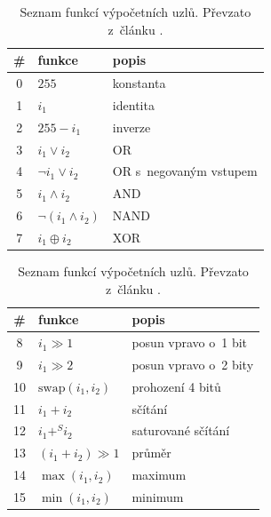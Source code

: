 \begin{table}[htb]
    \renewcommand{\arraystretch}{1.2}
    \begin{minipage}[t]{.5\textwidth}
        \small\centering\begin{tabular}{|c|l|l|}
            \hline
            \# & funkce & popis \\
            \hline
            0 & $255$ & konstanta \\
            1 & $i_1$ & identita \\
            2 & $255 - i_1$ & inverze \\
            3 & $i_1 \vee i_2$ & OR \\
            4 & $\neg i_1 \vee i_2$ & OR s~negovaným vstupem \\
            5 & $i_1 \wedge i_2$ & AND \\
            6 & $\neg (i_1 \wedge i_2)$ & NAND \\
            7 & $i_1 \oplus i_2$ & XOR \\
            \hline
        \end{tabular}

    \end{minipage}
    \begin{minipage}[t]{.5\textwidth}
        \small\centering\begin{tabular}{|c|l|l|}
            \hline
            \# & funkce & popis \\
            \hline
            8 & $i_1 \gg 1$ & posun vpravo o~1 bit \\
            9 & $i_1 \gg 2$ & posun vpravo o~2 bity \\
            10 & $\mathrm{swap}(i_1, i_2)$ & prohození 4 bitů \\
            11 & $i_1 + i_2$ & sčítání \\
            12 & $i_1 +^S i_2$ & saturované sčítání \\
            13 & $(i_1 + i_2) \gg 1$ & průměr \\
            14 & $\max(i_1, i_2)$ & maximum \\
            15 & $\min(i_1, i_2)$ & minimum \\
            \hline
        \end{tabular}

    \end{minipage}
    \caption{Seznam funkcí výpočetních uzlů. Převzato z~článku \cite{SikuPPSN}.}
    \label{tabCGPFunctions}
\end{table}

